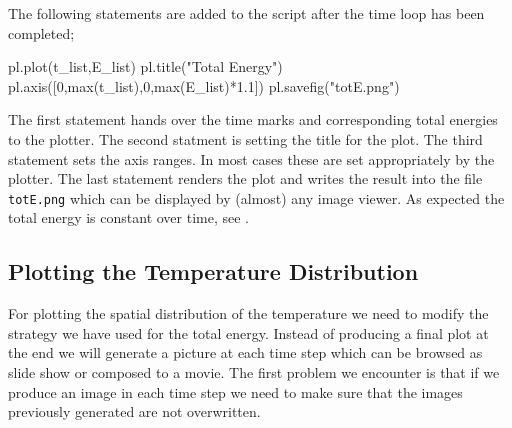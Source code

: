 The following statements are added to the script after the time loop has been completed;
\begin{python}
pl.plot(t_list,E_list)
pl.title("Total Energy")
pl.axis([0,max(t_list),0,max(E_list)*1.1])
pl.savefig("totE.png")
\end{python}
The first statement hands over the time marks and corresponding total energies to the plotter. 
The second statment is setting the title for the plot. The third statement
sets the axis ranges. In most cases these are set appropriately by the plotter.  
The last statement renders the plot and writes the 
result into the file \verb|totE.png| which can be displayed by (almost) any image viewer. 
As expected the total energy is constant over time, see .

\subsection{Plotting the Temperature Distribution}
\label{sec: plot T}
For plotting the spatial distribution of the temperature we need to modify the strategy we have used
for the total energy. Instead of producing a final plot at the end we will generate a 
picture at each time step which can be browsed as slide show or composed to a movie.
The first problem we encounter is that if we produce an image in each time step we need
to make sure that the images previously generated are not overwritten.

